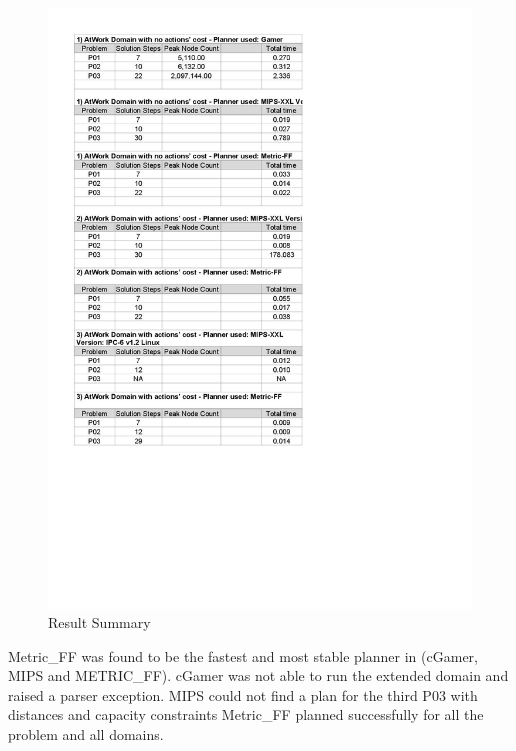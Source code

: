 \documentclass{article}
\begin{document}
\begin{figure}[H] %
	\centering
	\includegraphics[scale=0.6]{figures/Results_Summary-page-001.jpg} 
	\caption{Result Summary}
	\label{fig:Results}
\end{figure}

Metric\_FF was found to be the fastest and most stable planner in (cGamer, MIPS and METRIC\_FF). cGamer was not able to run the extended domain and raised a parser exception. MIPS could not find a plan for the third P03 with distances and capacity constraints Metric\_FF planned successfully for all the problem and all domains.

\newpage


\end{document}
